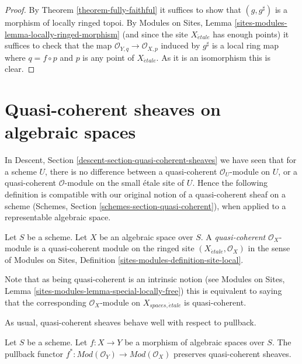 \begin{proof}
By
Theorem \ref{theorem-fully-faithful}
it suffices to show that $(g, g^\sharp)$ is a morphism of
locally ringed topoi. By
Modules on Sites, Lemma \ref{sites-modules-lemma-locally-ringed-morphism}
(and since the site $X_{\acute{e}tale}$ has enough points)
it suffices to check that the map
$\mathcal{O}_{Y, q} \to \mathcal{O}_{X, p}$ induced by $g^\sharp$
is a local ring map where $q = f \circ p$ and $p$ is any point of
$X_{\acute{e}tale}$. As it is an isomorphism this is clear.
\end{proof}














\section{Quasi-coherent sheaves on algebraic spaces}
\label{section-quasi-coherent}

\noindent
In
Descent, Section \ref{descent-section-quasi-coherent-sheaves}
we have seen that for a scheme $U$, there is no difference between a
quasi-coherent $\mathcal{O}_U$-module on $U$, or a quasi-coherent
$\mathcal{O}$-module on the small \'etale site of $U$. Hence the following
definition is compatible with our original notion of a quasi-coherent sheaf
on a scheme
(Schemes, Section \ref{schemes-section-quasi-coherent}),
when applied to a representable algebraic space.

\begin{definition}
\label{definition-quasi-coherent}
Let $S$ be a scheme. Let $X$ be an algebraic space over $S$.
A {\it quasi-coherent} $\mathcal{O}_X$-module
is a quasi-coherent module on the ringed site
$(X_{\acute{e}tale}, \mathcal{O}_X)$ in the sense of
Modules on Sites,
Definition \ref{sites-modules-definition-site-local}.
\end{definition}

\noindent
Note that as being quasi-coherent is an intrinsic notion (see
Modules on Sites, Lemma \ref{sites-modules-lemma-special-locally-free})
this is equivalent to saying that the corresponding $\mathcal{O}_X$-module
on $X_{spaces, \acute{e}tale}$ is quasi-coherent.

\medskip\noindent
As usual, quasi-coherent sheaves behave well with respect to pullback.

\begin{lemma}
\label{lemma-pullback-quasi-coherent}
Let $S$ be a scheme.
Let $f : X \to Y$ be a morphism of algebraic spaces over $S$.
The pullback functor
$f^* : \textit{Mod}(\mathcal{O}_Y) \to \textit{Mod}(\mathcal{O}_X)$
preserves quasi-coherent sheaves.
\end{lemma}

